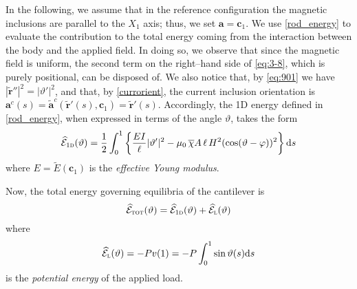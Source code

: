 \documentclass[oneside]{article}
\begin{document}
			In the following, we assume that in the reference configuration the magnetic inclusions are parallel to the $X_1$ axis; thus, we set
			$\bm a=\bm c_1$.
			We use \eqref{rod_energy} to evaluate the contribution to the total energy coming from the interaction between the body and the applied field. In doing so, we observe that since the magnetic field is uniform, the second term on the right--hand side of \eqref{eq:3-8}, which is purely positional, can be disposed of. We also notice that, by \eqref{eq:901} we have $|\bm \tilde{r}''|^2=|\vartheta'|^2$, and that, by \eqref{currorient}, the current inclusion orientation is
			$
			\bm a^c(s)=\widetilde{\bm a}^c(\tilde{\bm r}'(s),\bm c_1)= \tilde{\bm r}'(s).
			$
			Accordingly, the 1D energy defined in \eqref{rod_energy}, when expressed in terms of the angle $\vartheta$, takes the form
			\begin{equation}\label{strip_energy}
			\widehat{\mathcal E}_{1\textsc{d}}(\vartheta)=\frac 12 \int_0^1 \left\{\frac{EI}{\ell}|\vartheta'|^2 -\mu_0 \, \overline{\chi}A\,\ell\, H^2(\cos(\vartheta-\varphi))^2\right\}\text{d}s
			\end{equation}
			where $E=\widetilde E(\bm c_1)$ is the \emph{effective Young modulus}.
			
			Now, the total energy governing equilibria of the cantilever is 
			\[
			\widehat{\mathcal E}_{\textsc{tot}}(\vartheta)=\widehat{\mathcal E}_{\textsc{1d}}(\vartheta)+\widehat{\mathcal E}_{\textsc l}(\vartheta)
			\]
			where
			\[
			\widehat{\mathcal E}_{\textsc l}(\vartheta)=-Pv(1)=-P\int_0^1\sin\vartheta(s){\rm d}s
			\]
			is the \emph{potential energy} of the applied load.
			
\end{document}
